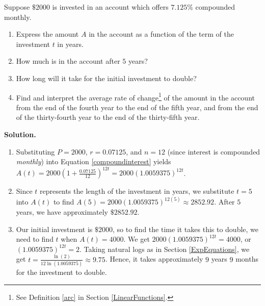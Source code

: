 \begin{ex}  \label{compoundinterestex} Suppose $\$2000$ is invested in an account which offers $7.125 \%$ compounded monthly.

\begin{enumerate}

\item Express the amount $A$ in the account as a function of the term of the investment $t$ in years.

\item  How much is in the account after $5$ years? 

\item  How long will it take for the initial investment to double?

\item  Find and interpret the average rate of change\footnote{See Definition \ref{arc} in Section \ref{LinearFunctions}.} of the amount in the account from the end of the fourth year to the end of the fifth year, and from the end of the thirty-fourth year to the end of the thirty-fifth year.


\end{enumerate}

{\bf Solution.}  

\begin{enumerate}

\item  Substituting $P = 2000$, $r = 0.07125$, and $n = 12$ (since interest is compounded \textit{monthly}) into Equation \ref{compoundinterest} yields $A(t) = 2000\left(1 + \frac{0.07125}{12}\right)^{12t}=2000 (1.0059375)^{12t}$.

\item  Since $t$ represents the length of the investment in years, we substitute $t=5$ into $A(t)$ to find $A(5) = 2000 (1.0059375)^{12(5)} \approx 2852.92$.  After $5$ years, we have approximately $\$2852.92$.

\item  Our initial investment is $\$2000$, so to find the time it takes this to double, we need to find $t$ when $A(t) = 4000$.  We get $2000 (1.0059375)^{12t}=4000$, or $(1.0059375)^{12t}=2$.  Taking natural logs as in Section \ref{ExpEquations}, we get $t = \frac{\ln(2)}{12 \ln(1.0059375)} \approx 9.75$.  Hence, it takes approximately $9$ years $9$ months for the investment to double.


\end{enumerate}
\end{ex}
